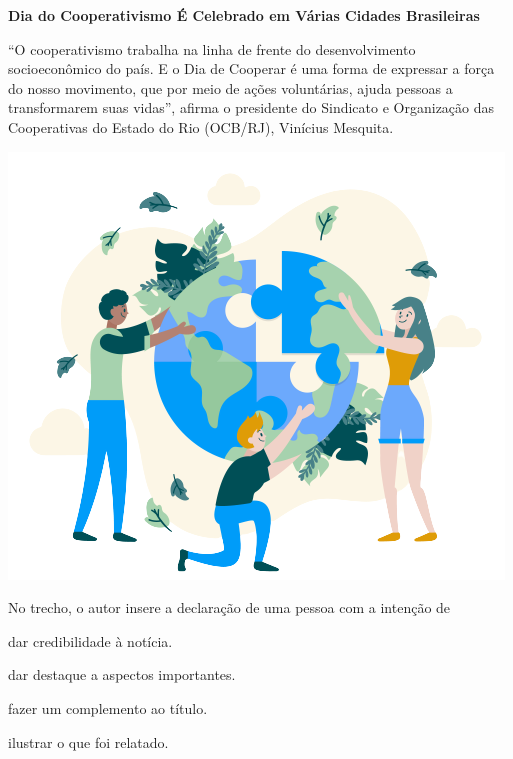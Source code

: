\begin{myquote}
\textbf{Dia do Cooperativismo É Celebrado em Várias Cidades Brasileiras}

``O cooperativismo trabalha na linha de frente do
desenvolvimento socioeconômico do país. E o Dia de Cooperar é uma forma
de expressar a força do nosso movimento, que por meio de ações
voluntárias, ajuda pessoas a transformarem suas vidas'', afirma o
presidente do Sindicato e Organização das Cooperativas do Estado do Rio
(OCB/RJ), Vinícius Mesquita.

\begin{center}
\includegraphics[width=.7\textwidth]{media/image52.png}
\end{center}

\end{myquote}

\pagebreak
No trecho, o autor insere a declaração de uma pessoa com a intenção de

\begin{escolha}
\item dar credibilidade à notícia.

\item dar destaque a aspectos importantes.

\item fazer um complemento ao título.

\item ilustrar o que foi relatado.
\end{escolha}


